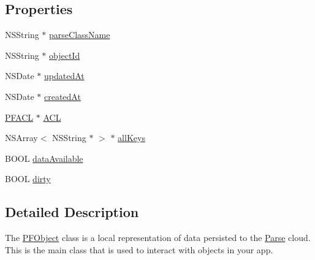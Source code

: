 \subsection*{Properties}
\begin{DoxyCompactItemize}
\item 
N\+S\+String $\ast$ \hyperlink{interface_p_f_object_acd02c0585de1cc52e3adae4f3ea631aa}{parse\+Class\+Name}
\begin{DoxyCompactList}\small\item\em 

 \end{DoxyCompactList}\item 
N\+S\+String $\ast$ \hyperlink{interface_p_f_object_ac957b8fb3842dcf264264c3f4af836f6}{object\+Id}
\item 
N\+S\+Date $\ast$ \hyperlink{interface_p_f_object_aa0bd6d2f6c6489b6cc06ef043c4b179a}{updated\+At}
\item 
N\+S\+Date $\ast$ \hyperlink{interface_p_f_object_ab9baa371bf6fc375e538dec6e95c4200}{created\+At}
\item 
\hyperlink{interface_p_f_a_c_l}{P\+F\+A\+C\+L} $\ast$ \hyperlink{interface_p_f_object_ad09c7decbf32c9119852e30da0bf09a6}{A\+C\+L}
\item 
N\+S\+Array$<$ N\+S\+String $\ast$ $>$ $\ast$ \hyperlink{interface_p_f_object_a5d9d53b30dd97739a64765a618a16ec0}{all\+Keys}
\item 
B\+O\+O\+L \hyperlink{interface_p_f_object_a8a1d2d2912359f7daeabea3337f79d67}{data\+Available}
\begin{DoxyCompactList}\small\item\em 

 \end{DoxyCompactList}\item 
B\+O\+O\+L \hyperlink{interface_p_f_object_a7de11c083384297eb896760eab880ecf}{dirty}
\begin{DoxyCompactList}\small\item\em 

 \end{DoxyCompactList}\end{DoxyCompactItemize}


\subsection{Detailed Description}
The {\ttfamily \hyperlink{interface_p_f_object}{P\+F\+Object}} class is a local representation of data persisted to the \hyperlink{interface_parse}{Parse} cloud. This is the main class that is used to interact with objects in your app. 

